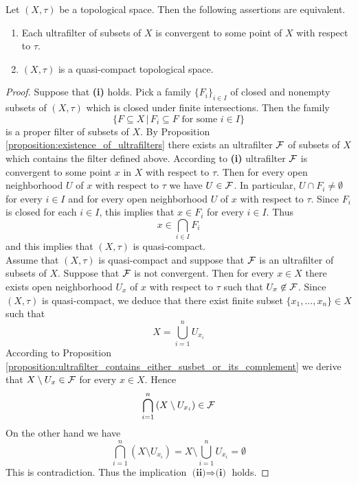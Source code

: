 \begin{theorem}\label{theorem:quasi_compact_in_terms_of_ultrafilters}
Let $(X,\tau)$ be a topological space. Then the following assertions are equivalent.
\begin{enumerate}[label=\emph{\textbf{(\roman*)}}, leftmargin=*]
\item Each ultrafilter of subsets of $X$ is convergent to some point of $X$ with respect to $\tau$.
\item $(X,\tau)$ is a quasi-compact topological space.
\end{enumerate}
\end{theorem}
\begin{proof}
Suppose that \textbf{(i)} holds. Pick a family $\{F_i\}_{i\in I}$ of closed and nonempty subsets of $\left(X,\tau\right)$ which is closed under finite intersections. Then the family
$$\big\{F\subseteq X\,\big|\,F_i\subseteq F\mbox{ for some }i\in I\big\}$$
is a proper filter of subsets of $X$. By Proposition \ref{proposition:existence_of_ultrafilters} there exists an ultrafilter ${\mathcal F}$ of subsets of $X$ which contains the filter defined above. According to \textbf{(i)} ultrafilter ${\mathcal F}$ is convergent to some point $x$ in $X$ with respect to $\tau$. Then for every open neighborhood $U$ of $x$ with respect to $\tau$ we have $U \in {\mathcal F}$. In particular, $U\cap F_i \neq \emptyset$ for every $i\in I$ and for every open neighborhood $U$ of $x$ with respect to $\tau$. Since $F_i$ is closed for each $i\in I$, this implies that $x \in F_i$ for every $i \in I$. Thus
$$x \in  \bigcap_{i\in I}F_i$$
and this implies that $\left(X,\tau\right)$ is quasi-compact.\\
Assume that $(X,\tau)$ is quasi-compact and suppose that ${\mathcal F}$ is an ultrafilter of subsets of $X$. Suppose that ${\mathcal F}$ is not convergent. Then for every $x \in X$ there exists open neighborhood $U_x$ of $x$ with respect to $\tau$ such that $U_x \not \in {\mathcal F}$. Since $\left(X,\tau\right)$ is quasi-compact, we deduce that there exist finite subset $\{x_1,...,x_n\} \in X$ such that 
$$X = \bigcup_{i=1}^nU_{x_i}$$
According to Proposition \ref{proposition:ultrafilter_contains_either_susbet_or_its_complement} we derive that $X\setminus U_x \in {\mathcal F}$ for every $x \in X$. Hence
$$\bigcap_{i=1}^n\left(X\setminus U_{x_i}\right) \in {\mathcal F}$$
On the other hand we have
$$\bigcap_{i=1}^n\left(X\setminus U_{x_i}\right) = X \setminus \bigcup_{i=1}^nU_{x_i} = \emptyset$$
This is contradiction. Thus the implication $\textbf{(ii)}\Rightarrow \textbf{(i)}$ holds.
\end{proof}

